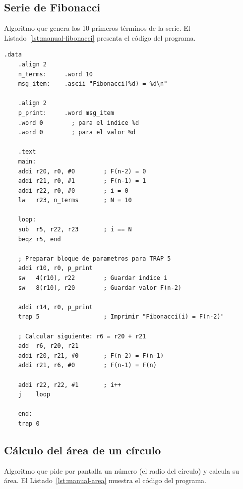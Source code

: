 \documentclass[../main.tex]{subfiles}
\begin{document}
\subsection{Serie de Fibonacci}

Algoritmo que genera los 10 primeros términos de la serie. El Listado~\ref{lst:manual-fibonacci} presenta el código del programa.

\begin{lstlisting}[caption={Algoritmo de Fibonacci.},label={lst:manual-fibonacci}]
	.data
	.align 2
	n_terms:     .word 10
	msg_item:    .ascii "Fibonacci(%d) = %d\n"
	
	.align 2
	p_print:     .word msg_item
	.word 0        ; para el indice %d
	.word 0        ; para el valor %d
	
	.text
	main:
	addi r20, r0, #0        ; F(n-2) = 0
	addi r21, r0, #1        ; F(n-1) = 1
	addi r22, r0, #0        ; i = 0
	lw   r23, n_terms       ; N = 10
	
	loop:
	sub  r5, r22, r23       ; i == N
	beqz r5, end
	
	; Preparar bloque de parametros para TRAP 5
	addi r10, r0, p_print
	sw   4(r10), r22        ; Guardar indice i
	sw   8(r10), r20        ; Guardar valor F(n-2)
	
	addi r14, r0, p_print
	trap 5                  ; Imprimir "Fibonacci(i) = F(n-2)"
	
	; Calcular siguiente: r6 = r20 + r21
	add  r6, r20, r21
	addi r20, r21, #0       ; F(n-2) = F(n-1)
	addi r21, r6, #0        ; F(n-1) = F(n)
	
	addi r22, r22, #1       ; i++
	j    loop
	
	end:
	trap 0
\end{lstlisting}

\subsection{Cálculo del área de un círculo}

Algoritmo que pide por pantalla un número (el radio del círculo) y calcula su área. El Listado~\ref{lst:manual-area} muestra el código del programa.
\end{document}
